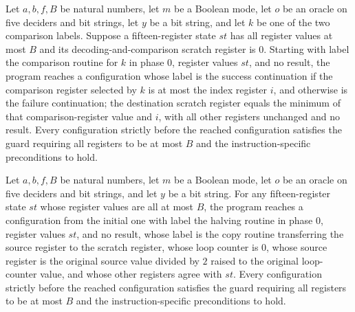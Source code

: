 \begin{theorem}
\label{Complexity.PathHard.le_run}
\leanok
{}
Let $a,b,f,B$ be natural numbers, let $m$ be a Boolean mode, let $o$ be an oracle on
five deciders and bit strings, let $y$ be a bit string, and let $k$ be one of the two
comparison labels. Suppose a fifteen-register state $st$ has all register values at most
$B$ and its decoding-and-comparison scratch register is $0$. Starting with label the
comparison routine for $k$ in phase $0$, register values $st$, and no result, the
program reaches a configuration whose label is the success continuation if the
comparison register selected by $k$ is at most the index register $i$, and otherwise is
the failure continuation; the destination scratch register equals the minimum of that
comparison-register value and $i$, with all other registers unchanged and no result.
Every configuration strictly before the reached configuration satisfies the guard
requiring all registers to be at most $B$ and the instruction-specific preconditions to
hold.
\end{theorem}

\begin{theorem}
\label{Complexity.PathHard.hv_run}
\leanok
{}
Let $a,b,f,B$ be natural numbers, let $m$ be a Boolean mode, let $o$ be an oracle on
five deciders and bit strings, and let $y$ be a bit string. For any fifteen-register
state $st$ whose register values are all at most $B$, the program reaches a
configuration from the initial one with label the halving routine in phase $0$, register
values $st$, and no result, whose label is the copy routine transferring the source
register to the scratch register, whose loop counter is $0$, whose source register is
the original source value divided by $2$ raised to the original loop-counter value, and
whose other registers agree with $st$. Every configuration strictly before the reached
configuration satisfies the guard requiring all registers to be at most $B$ and the
instruction-specific preconditions to hold.
\end{theorem}
